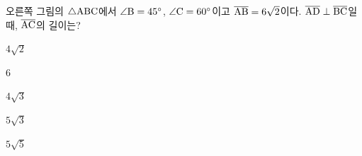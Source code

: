 \noindent\begin{minipage}[t]{0.58\linewidth}\vspace{0pt}\raggedright 오른쪽 그림의 $\triangle\mathrm{ABC}$에서 $\angle\mathrm{B}=45^\circ$, $\angle\mathrm{C}=60^\circ$이고 $\overline{\mathrm{AB}}=6\sqrt{2}$이다. $\overline{\mathrm{AD}}\perp\overline{\mathrm{BC}}$일 때, $\overline{\mathrm{AC}}$의 길이는?\end{minipage}\hfill\begin{minipage}[t]{0.4\linewidth}\vspace{0pt}\centering \resizebox{\ifdim\width>\linewidth\linewidth\else\width\fi}{!}{}\end{minipage}\par
\begin{choices32}{\rule[-3ex]{0pt}{8ex}$4\sqrt{2}$}{\rule[-3ex]{0pt}{8ex}$6$}{\rule[-3ex]{0pt}{8ex}$4\sqrt{3}$}{\rule[-3ex]{0pt}{8ex}$5\sqrt{3}$}{\rule[-3ex]{0pt}{8ex}$5\sqrt{5}$}\end{choices32}
